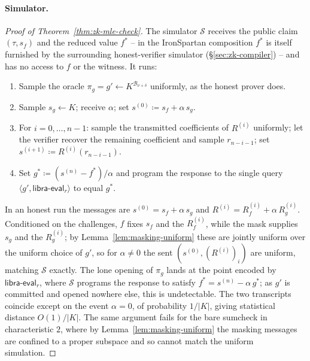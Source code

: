 \documentclass{article}
\theoremstyle{definition}
\newcommand{\BB}{\mathcal{B}}
\begin{document}
\paragraph{Simulator.}
\begin{proof}[Proof of Theorem~\ref{thm:zk-mle-check}]
The simulator $\mathcal{S}$ receives the public claim $(\tau, s_f)$ and the reduced value $f^*$ -- in the IronSpartan composition $f^*$ is itself furnished by the surrounding honest-verifier simulator (\S\ref{sec:zk-compiler}) -- and has no access to $f$ or the witness. It runs:
\begin{enumerate}
\item Sample the oracle $\pi_g = g' \gets K^{\BB_{\nu + \delta}}$ uniformly, as the honest prover does.
\item Sample $s_g \gets K$; receive $\alpha$; set $s^{(0)} \coloneqq s_f + \alpha\, s_g$.
\item For $i = 0, \ldots, n - 1$: sample the transmitted coefficients of $R^{(i)}$ uniformly; let the verifier recover the remaining coefficient and sample $r_{n - i - 1}$; set $s^{(i + 1)} \coloneqq R^{(i)}(r_{n - i - 1})$.
\item Set $g^* \coloneqq (s^{(n)} - f^*)/\alpha$ and program the response to the single query $\langle g', \textsf{libra-eval}_r \rangle$ to equal $g^*$.
\end{enumerate}
In an honest run the messages are $s^{(0)} = s_f + \alpha\, s_g$ and $R^{(i)} = R_f^{(i)} + \alpha\, R_g^{(i)}$. Conditioned on the challenges, $f$ fixes $s_f$ and the $R_f^{(i)}$, while the mask supplies $s_g$ and the $R_g^{(i)}$; by Lemma~\ref{lem:masking-uniform} these are jointly uniform over the uniform choice of $g'$, so for $\alpha \neq 0$ the sent $(s^{(0)}, (R^{(i)})_i)$ are uniform, matching $\mathcal{S}$ exactly. The lone opening of $\pi_g$ lands at the point encoded by $\textsf{libra-eval}_r$, where $\mathcal{S}$ programs the response to satisfy $f^* = s^{(n)} - \alpha\, g^*$; as $g'$ is committed and opened nowhere else, this is undetectable. The two transcripts coincide except on the event $\alpha = 0$, of probability $1/|K|$, giving statistical distance $O(1)/|K|$. The same argument fails for the bare sumcheck in characteristic $2$, where by Lemma~\ref{lem:masking-uniform} the masking messages are confined to a proper subspace and so cannot match the uniform simulation.
\end{proof}

\printbibliography
\end{document}
